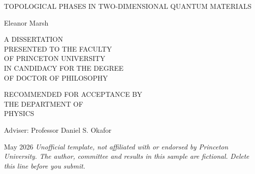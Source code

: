 \begin{titlepage}
\centering
\vspace*{0.5in}
{\MakeUppercase{Topological Phases in Two-Dimensional Quantum Materials}\par}
\vspace{0.5in}
Eleanor Marsh\par
\vspace{0.6in}
A DISSERTATION\\
PRESENTED TO THE FACULTY\\
OF PRINCETON UNIVERSITY\\
IN CANDIDACY FOR THE DEGREE\\
OF DOCTOR OF PHILOSOPHY\par
\vspace{0.4in}
RECOMMENDED FOR ACCEPTANCE BY\\
THE DEPARTMENT OF\\
\MakeUppercase{Physics}\par
\vspace{0.4in}
Adviser: Professor Daniel S. Okafor\par
\vspace{0.4in}
May 2026
\vfill
{\footnotesize\itshape Unofficial template, not affiliated with or endorsed by Princeton University. The author, committee and results in this sample are fictional. Delete this line before you submit.}
\end{titlepage}
\setcounter{page}{2}

